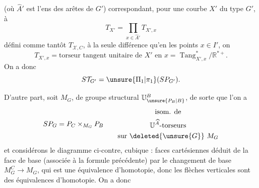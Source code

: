 (où $\widehat{A}'$ est l'ens des arêtes de $G'$) correspondant,  pour une courbe $X'$ du type $G'$, à   
\[
T_{X'}=\prod_{x\in\widehat{A}'}T_{X',x}
\]
défini comme tantôt $T_{\mathcal{X},C}$, à la seule différence qu'en les points $x\in I'$, on 
\[
T_{X',x}=\text{torseur tangent unitaire de $X'$ en $x$}
=\operatorname{Tang}_{X',x}^{*}/\mathbb{R}^{*+}.
\]
On a donc
\[
S\mathcal{T}_{G'}=\unsure{\Pi_1|\pi_1}(SP_{G'}).
\]

D'autre part, soit   $M_G$, de groupe structural $\mathbb{U}_{\unsure{P_B|B}}^B$, de sorte que l'on a
\[
SP_G=P_C\times_{M_G}P_B
\qquad\begin{gathered}\text{isom. de}\\\mathbb{U}^{\widehat A}\text{-torseurs}\\\text{sur }\deleted{\unsure{G}}\ M_G\end{gathered}
\]
et considérons le diagramme ci-contre,
cubique : faces cartésiennes déduit de la face de base (associée à la formule précédente) par le changement de base $M_G^C\longrightarrow M_G$, qui est une équivalence d'homotopie, donc  les flèches verticales sont des équivalences d'homotopie. On a donc
